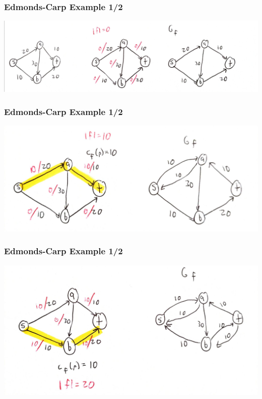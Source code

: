 \documentclass[10pt,aspectratio=169]{beamer}
\begin{document}
\begin{frame} \frametitle{Edmonds-Carp Example 1/2}
\begin{center}
  \includegraphics[scale=.12]{ek-1-1.jpg}
\end{center}
\end{frame}

\begin{frame} \frametitle{Edmonds-Carp Example 1/2}
\begin{center}
  \includegraphics[scale=.12]{ek-1-2.jpg}
\end{center}
\end{frame}

\begin{frame} \frametitle{Edmonds-Carp Example 1/2}
\begin{center}
  \includegraphics[scale=.12]{ek-1-3.jpg}
\end{center}
\end{frame}
\end{document}
